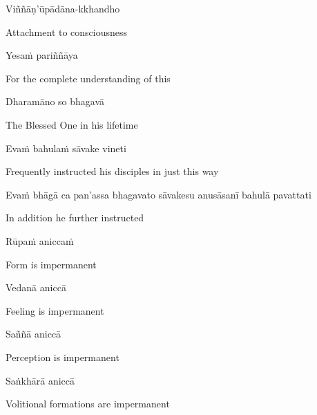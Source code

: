 Viññāṇ'ūpādāna-kkhandho

\begin{english}
  Attachment to consciousness\ifdigitalversion\makeatletter\hyperlink{endnote17-appendix}\makeatother\fi
\end{english}

\suttaRef{[DN 22]}

Yesaṁ pariññāya

\begin{english}
  For the complete understanding of this
\end{english}

Dharamāno so bhagavā

\begin{english}
  The Blessed One in his lifetime
\end{english}

Evaṁ bahulaṁ sāvake vineti

\begin{english}
  Frequently instructed his disciples in just this way
\end{english}

\begin{pali-hang}
  Evaṁ bhāgā ca pan'assa bhagavato sāvakesu anusāsanī bahulā pavattati
\end{pali-hang}

\begin{english}
  In addition he further instructed
\end{english}

\suttaRef{[Thai]}

Rūpaṁ aniccaṁ

\begin{english}
  Form is impermanent
\end{english}

Vedanā aniccā

\begin{english}
  Feeling is impermanent
\end{english}

Saññā aniccā

\begin{english}
  Perception is impermanent
\end{english}

Saṅkhārā aniccā

\begin{english}
  Volitional formations are impermanent\ifdigitalversion\makeatletter\hyperlink{endnote18-appendix}\makeatother\fi
\end{english}

